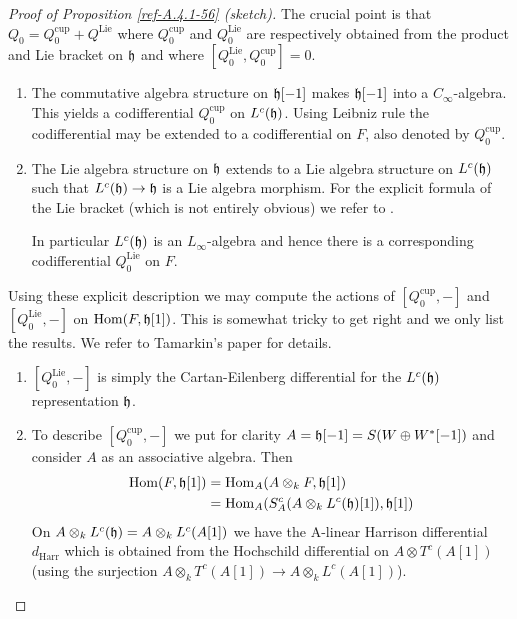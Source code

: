 \documentclass{amsart}
\numberwithin{equation}{section}
\theoremstyle{definition}
\theoremstyle{remark}
\begin{document}
\begin{proof}[Proof of Proposition \ref{ref-A.4.1-56} (sketch)]
The crucial
point is that $Q_0=Q^{\operatorname{cup}}_0+Q^{\operatorname{Lie}}$ where $Q^{\operatorname{cup}}_0$ and
$Q_0^{\operatorname{Lie}}$ are respectively obtained from the product and Lie
bracket on $\frak{h}$ and where $[Q_0^{\operatorname{Lie}},Q_0^{\operatorname{cup}}]=0$. 
\begin{enumerate}
\item The commutative algebra structure on $\frak{h}[-1]$ makes
  $\frak{h}[-1]$ into a $C_\infty$-algebra. This yields a
  codifferential $Q_0^{\text{cup}}$ on $L^c(\frak{h})$. Using Leibniz
rule the codifferential may be extended to a codifferential on $F$, also
denoted by $Q_0^{\text{cup}}$. 
\item The Lie algebra structure on $\frak{h}$ extends to a Lie algebra
structure on $L^c(\frak{h})$ such that $L^c(\frak{h})\rightarrow \frak{h}$ is
a Lie algebra morphism. For the explicit formula of the Lie bracket
(which is not entirely obvious) we refer to \cite[\S3.1]{Fresse}.

In particular $L^c(\frak{h})$ is an $L_\infty$-algebra and hence
there is a corresponding codifferential $Q_0^{\operatorname{Lie}}$ on $F$. 
\end{enumerate}
Using these explicit description we may compute the actions of 
$[Q_0^{\text{cup}},-]$ and $[Q_0^{\text{Lie}},-]$ on ${\operatorname {Hom}}(F,\frak{h}[1])$.
This is somewhat tricky to get right and we only list the results. We refer to Tamarkin's
paper for details. 
\begin{enumerate}
\item $[Q_0^{\operatorname{Lie}},-]$ is simply the Cartan-Eilenberg differential for the
$L^c(\frak{h})$ representation $\frak{h}$. 
\item To describe $[Q_0^{\operatorname{cup}},-]$ we put for clarity
  $A=\frak{h}[-1]=S(W\oplus W^\ast[-1])$ and consider $A$ as an
  associative algebra.
Then
\begin{align*}
{\operatorname {Hom}}(F,\frak{h}[1])&={\operatorname {Hom}}_A(A\otimes_k F,\frak{h}[1])\\
&={\operatorname {Hom}}_A(S^c_A(A\otimes_k L^c(\frak{h})[1]),\frak{h}[1])
\end{align*}
On $A\otimes_k L^c(\frak{h})=A\otimes_k L^c(A[1])$ we have the A-linear Harrison differential $d_{\operatorname{Harr}}$
which is obtained from the Hochschild differential on $A\otimes T^c(A[1])$
(using the surjection $A\otimes_k T^c(A[1])\rightarrow A\otimes_k L^c(A[1])$). 


\end{enumerate}
\end{proof}
\end{document}
